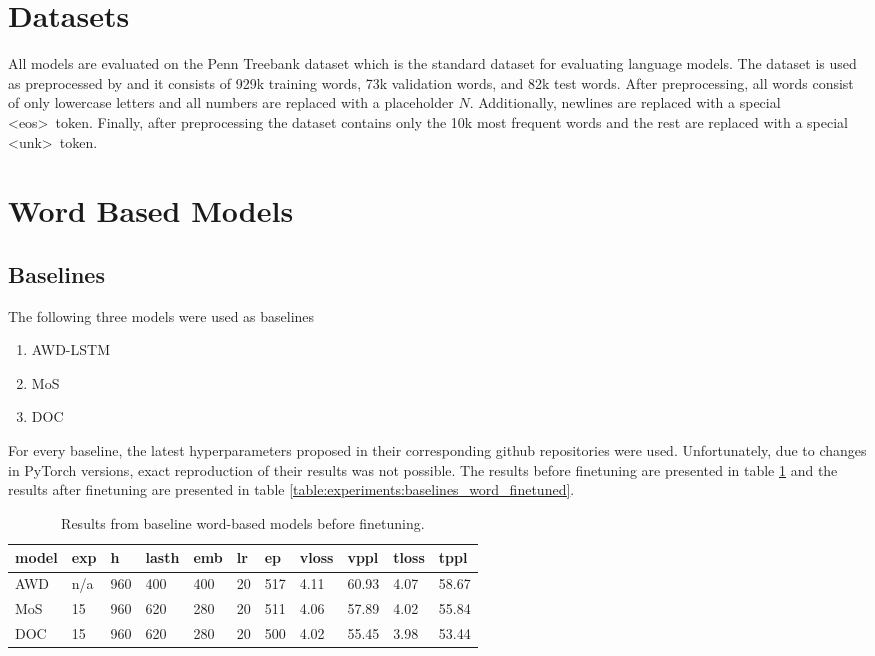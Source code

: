 \section{Datasets}
All models are evaluated on the Penn Treebank dataset which is the standard dataset for evaluating language models. The dataset is used as preprocessed by \citet{mikolov2011empirical} and it consists of 929k training words, 73k validation words, and 82k test words. After preprocessing, all words consist of only lowercase letters and all numbers are replaced with a placeholder $ N $. Additionally, newlines are replaced with a special \textless eos\textgreater \ token. Finally, after preprocessing the dataset contains only the 10k most frequent words and the rest are replaced with a special \textless unk\textgreater \ token.

\section{Word Based Models}

\subsection{Baselines}

The following three models were used as baselines

\begin{enumerate}
    \item AWD-LSTM \citep{merity2017regularizing}
    \item MoS \citep{yang2017breaking}
    \item DOC \citep{takase2018direct}
\end{enumerate}

For every baseline, the latest hyperparameters proposed in their corresponding github repositories were used. Unfortunately, due to changes in PyTorch versions, exact reproduction of their results was not possible. The results before finetuning are presented in table \ref{table:experiments:baselines_word} and the results after finetuning are presented in table \ref{table:experiments:baselines_word_finetuned}.

\begin{table}
\caption{Results from baseline word-based models before finetuning.}
\begin{tabular}{|l|l|l|l|l|l|l|l|l|l|l|}
\hline
\textbf{model}    & \textbf{exp} & \textbf{h}   & \textbf{lasth} & \textbf{emb} & \textbf{lr} & \textbf{ep}  & \textbf{vloss} & \textbf{vppl}  & \textbf{tloss} & \textbf{tppl}  \\ \hline
AWD      & n/a & 960 & 400   & 400 & 20 & 517 & 4.11  & 60.93 & 4.07  & 58.67 \\ \hline
MoS      & 15  & 960 & 620   & 280 & 20 & 511 & 4.06  & 57.89 & 4.02  & 55.84 \\ \hline
DOC      & 15  & 960 & 620   & 280 & 20 & 500 & 4.02  & 55.45 & 3.98  & 53.44 \\ \hline
\end{tabular}
\label{table:experiments:baselines_word}
\end{table}

